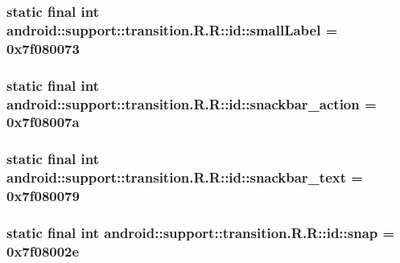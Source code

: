 \hypertarget{classandroid_1_1support_1_1transition_1_1_r_1_1id_6331a977f94bc8799197ce713e17f8a1}{
\subsubsection[{smallLabel}]{\setlength{\rightskip}{0pt plus 5cm}static final int android::support::transition.R.R::id::smallLabel = 0x7f080073}}
\label{classandroid_1_1support_1_1transition_1_1_r_1_1id_6331a977f94bc8799197ce713e17f8a1}


\hypertarget{classandroid_1_1support_1_1transition_1_1_r_1_1id_86ef3bb84ab55ce109cd20a362c0f2cd}{
\subsubsection[{snackbar\_\-action}]{\setlength{\rightskip}{0pt plus 5cm}static final int android::support::transition.R.R::id::snackbar\_\-action = 0x7f08007a}}
\label{classandroid_1_1support_1_1transition_1_1_r_1_1id_86ef3bb84ab55ce109cd20a362c0f2cd}


\hypertarget{classandroid_1_1support_1_1transition_1_1_r_1_1id_b27c1397cc5de738496c254dd92a8ee5}{
\subsubsection[{snackbar\_\-text}]{\setlength{\rightskip}{0pt plus 5cm}static final int android::support::transition.R.R::id::snackbar\_\-text = 0x7f080079}}
\label{classandroid_1_1support_1_1transition_1_1_r_1_1id_b27c1397cc5de738496c254dd92a8ee5}


\hypertarget{classandroid_1_1support_1_1transition_1_1_r_1_1id_8f7a3aa96016179fae10d8b453ce98c2}{
\subsubsection[{snap}]{\setlength{\rightskip}{0pt plus 5cm}static final int android::support::transition.R.R::id::snap = 0x7f08002e}}
\label{classandroid_1_1support_1_1transition_1_1_r_1_1id_8f7a3aa96016179fae10d8b453ce98c2}


